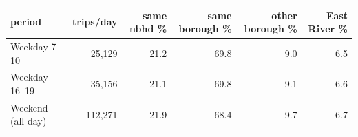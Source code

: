 \begin{tabular}{lrrrrr}
\toprule
\textbf{period} & \textbf{trips/day} & \textbf{same nbhd \%} & \textbf{same borough \%} & \textbf{other borough \%} & \textbf{East River \%} \\
\midrule
Weekday 7--10 & 25,129 & 21.2 & 69.8 & 9.0 & 6.5 \\
Weekday 16--19 & 35,156 & 21.1 & 69.8 & 9.1 & 6.6 \\
Weekend (all day) & 112,271 & 21.9 & 68.4 & 9.7 & 6.7 \\
\bottomrule
\end{tabular}
